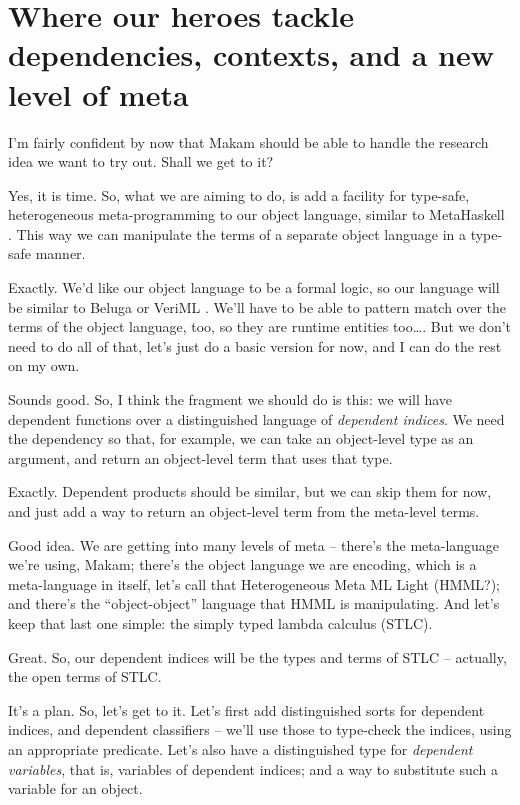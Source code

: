 \section{Where our heroes tackle dependencies, contexts, and a new level
of
meta}\label{where-our-heroes-tackle-dependencies-contexts-and-a-new-level-of-meta}

\heroSTUDENT{} I'm fairly confident by now that Makam should be able to handle
the research idea we want to try out. Shall we get to it?

\heroADVISOR{} Yes, it is time. So, what we are aiming to do, is add a
facility for type-safe, heterogeneous meta-programming to our object
language, similar to MetaHaskell \citep{mainland2012explicitly}. This
way we can manipulate the terms of a separate object language in a
type-safe manner.

\heroSTUDENT{} Exactly. We'd like our object language to be a formal logic, so
our language will be similar to Beluga \citep{pientka2010beluga} or
VeriML \citep{stampoulis2013veriml}. We'll have to be able to pattern
match over the terms of the object language, too, so they are runtime
entities too\ldots{}. But we don't need to do all of that, let's just do
a basic version for now, and I can do the rest on my own.

\heroADVISOR{} Sounds good. So, I think the fragment we should do is this: we
will have dependent functions over a distinguished language of
\emph{dependent indices}. We need the dependency so that, for example,
we can take an object-level type as an argument, and return an
object-level term that uses that type.

\heroSTUDENT{} Exactly. Dependent products should be similar, but we can skip
them for now, and just add a way to return an object-level term from the
meta-level terms.

\heroADVISOR{} Good idea. We are getting into many levels of meta -- there's
the meta-language we're using, Makam; there's the object language we are
encoding, which is a meta-language in itself, let's call that
Heterogeneous Meta ML Light (HMML?); and there's the ``object-object''
language that HMML is manipulating. And let's keep that last one simple:
the simply typed lambda calculus (STLC).

\heroSTUDENT{} Great. So, our dependent indices will be the types and terms of
STLC -- actually, the open terms of STLC.

\heroADVISOR{} It's a plan. So, let's get to it. Let's first add distinguished
sorts for dependent indices, and dependent classifiers -- we'll use
those to type-check the indices, using an appropriate predicate. Let's
also have a distinguished type for \emph{dependent variables}, that is,
variables of dependent indices; and a way to substitute such a variable
for an object.

